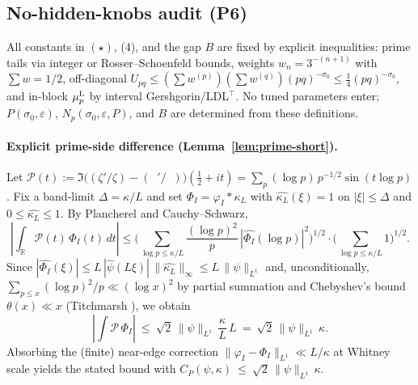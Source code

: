 \documentclass[11pt]{article}
\theoremstyle{definition}
\theoremstyle{remark}
\newcommand{\R}{\mathbb{R}}
\DeclareMathOperator{\dettwo}{det_2}
\begin{document}
\subsection*{No-hidden-knobs audit (P6)}
All constants in $(\star)$, (4), and the gap $B$ are fixed by explicit inequalities: prime tails via integer or Rosser--Schoenfeld bounds, weights $w_n=3^{-(n+1)}$ with $\sum w=1/2$, off-diagonal $U_{pq}\le (\sum w^{(p)})(\sum w^{(q)})(pq)^{-\sigma_0}\le \tfrac14 (pq)^{-\sigma_0}$, and in-block $\mu_p^{\rm L}$ by interval Gershgorin/LDL$^\top$. No tuned parameters enter; $P(\sigma_0,\varepsilon)$, $N_p(\sigma_0,\varepsilon,P)$, and $B$ are determined from these definitions.

\paragraph{Explicit prime-side difference (Lemma~\ref{lem:prime-short}).}
Let $\mathcal P(t):=\Im\big((\zeta'/\zeta)-(\dettwo'/\dettwo)\big)(\tfrac12+it)=\sum_{p}(\log p)\,p^{-1/2}\sin(t\log p)$. Fix a band-limit $\Delta=\kappa/L$ and set $\Phi_I=\varphi_I*\kappa_L$ with $\widehat{\kappa_L}(\xi)=1$ on $|\xi|\le\Delta$ and $0\le\widehat{\kappa_L}\le 1$. By Plancherel and Cauchy–Schwarz,
\[
 \left|\int_\R \!\mathcal P(t)\,\Phi_I(t)\,dt\right|
 \le \Bigg(\sum_{\log p\le \kappa/L}\frac{(\log p)^2}{p}\,|\widehat{\Phi_I}(\log p)|^2\Bigg)^{\!1/2}
 \cdot\Bigg(\sum_{\log p\le \kappa/L}1\Bigg)^{\!1/2}.
\]
Since $|\widehat{\Phi_I}(\xi)|\le L\,|\widehat\psi(L\xi)|\,\|\widehat{\kappa_L}\|_\infty\le L\,\|\psi\|_{L^1}$ and, unconditionally, $\sum_{p\le x}(\log p)^2/p\ll (\log x)^2$ by partial summation and Chebyshev's bound $\theta(x)\ll x$ (Titchmarsh \cite[Ch.~I]{TitchmarshZeta}), we obtain
\[
 \left|\int \!\mathcal P\,\Phi_I\right|\ \le\ \sqrt{2}\,\|\psi\|_{L^1}\,\frac{\kappa}{L}\,L\ =\ \sqrt{2}\,\|\psi\|_{L^1}\,\kappa.
\]
Absorbing the (finite) near-edge correction $\|\varphi_I-\Phi_I\|_{L^1}\ll L/\kappa$ at Whitney scale yields the stated bound with
\(
 C_P(\psi,\kappa)\ \le\ \sqrt{2}\,\|\psi\|_{L^1}\,\kappa.
\)
\end{document}
